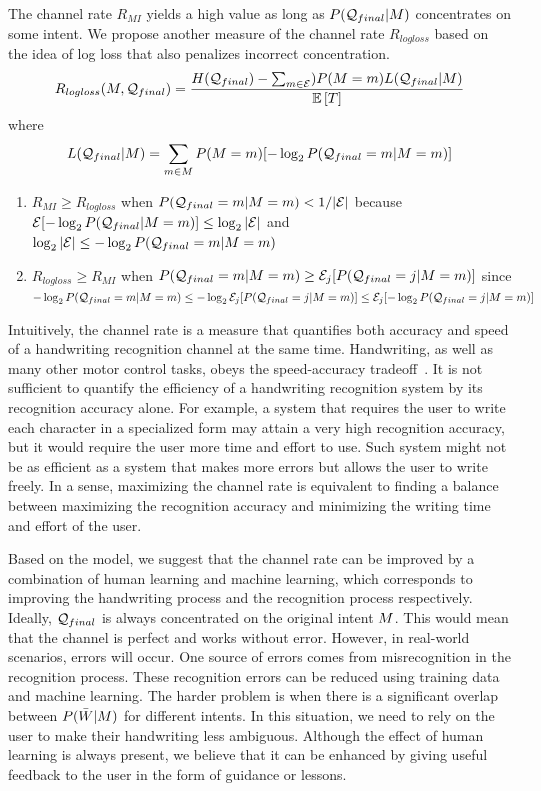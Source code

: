 \documentclass{sigchi}
\begin{document}
The channel rate $R_{MI}$ yields a high value as long as $P(\mathcal{Q}_{final} |
M)$ concentrates on some intent. We propose another measure of
the channel rate $R_{logloss}$ based on the idea of log loss that
also penalizes incorrect concentration.
\[
R_{logloss}(M, \mathcal{Q}_{final})
=
\frac{H(\mathcal{Q}_{final}) - \sum_{m \in \mathcal{E}})
P(M = m) L(\mathcal{Q}_{final} | M)}{\mathbb{E} \left[T\right]}
\]
where
\[
L(\mathcal{Q}_{final} | M) 
=  
\sum_{m \in M} P(M = m) [ - \log_2 P(\mathcal{Q}_{final} = m |
M = m) ]
\]

\begin{enumerate}
\item $R_{MI} \ge R_{logloss}$ when $P(\mathcal{Q}_{final} = m | M =m) < 1/|\mathcal{E}|$ 
because $\mathcal{E}[-\log_2 P(\mathcal{Q}_{final} | M = m)] \le \log_2
|\mathcal{E}|$ and $\log_2 |\mathcal{E}| \le -\log_2 P(\mathcal{Q}_{final} = m |
M = m)$\\
\item $R_{logloss} \ge R_{MI}$ when $P(\mathcal{Q}_{final} = m | M =m)
  \ge \mathcal{E}_j[P(\mathcal{Q}_{final} = j | M = m)]$ since $-\log_2
  P(\mathcal{Q}_{final} = m | M =m) \le -\log_2
  \mathcal{E}_j[P(\mathcal{Q}_{final} = j | M = m)] \le \mathcal{E}_j[
  -\log_2 P(\mathcal{Q}_{final} = j | M = m)]$ 
\end{enumerate}

Intuitively, the channel rate is a measure that quantifies both
accuracy and speed of a handwriting recognition channel at the same
time. Handwriting, as well as many other motor control tasks, obeys
the speed-accuracy tradeoff~\cite{Fitts1954}. It is not sufficient to
quantify the efficiency of a handwriting recognition system by its
recognition accuracy alone. For example, a system that requires the
user to write each character in a specialized form may attain a very
high recognition accuracy, but it would require the user more time and
effort to use. Such system might not be as efficient as a system that
makes more errors but allows the user to write freely. In a sense,
maximizing the channel rate is equivalent to finding a balance between
maximizing the recognition accuracy and minimizing the writing time
and effort of the user.

Based on the model, we suggest that the channel rate can be improved
by a combination of human learning and machine learning, which
corresponds to improving the handwriting process and the recognition
process respectively. Ideally, $\mathcal{Q}_{final}$ is always concentrated
on the original intent $M$. This would mean that the channel is
perfect and works without error. However, in real-world scenarios,
errors will occur. One source of errors comes from misrecognition in
the recognition process. These recognition errors can be reduced using
training data and machine learning. The harder problem is when there
is a significant overlap between $P(\bar{W} | M)$ for different
intents. In this situation, we need to rely on the user to make
their handwriting less ambiguous. Although the effect of human
learning is always present, we believe that it can be enhanced by
giving useful feedback to the user in the form of guidance or lessons.
\end{document}
